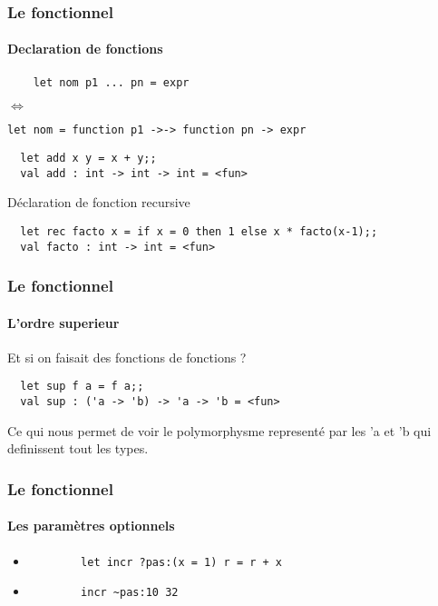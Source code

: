 \begin{frame}[fragile]
  \frametitle{Le fonctionnel}
  \framesubtitle{Declaration de fonctions}
    \begin{lstlisting}
	let nom p1 ... pn = expr
    \end{lstlisting}
	\begin{center}
	  \begin{rotate}{90}
     $\Leftrightarrow$
   \end{rotate}
\end{center}
\begin{lstlisting}
let nom = function p1 ->-> function pn -> expr
  \end{lstlisting}
  \vspace{1cm}
  \begin{lstlisting}
  let add x y = x + y;;
  val add : int -> int -> int = <fun>
  \end{lstlisting}
  Déclaration de fonction recursive 
  \begin{lstlisting}
  let rec facto x = if x = 0 then 1 else x * facto(x-1);;
  val facto : int -> int = <fun>
  \end{lstlisting}
\end{frame}

\begin{frame}[fragile]
  \frametitle{Le fonctionnel}
  \framesubtitle{L'ordre superieur}
  Et si on faisait des fonctions de fonctions ? 
 \begin{lstlisting}
  let sup f a = f a;;
  val sup : ('a -> 'b) -> 'a -> 'b = <fun>
 \end{lstlisting}
 Ce qui nous permet de voir le polymorphysme representé par les 'a et 'b qui definissent tout les types.
\end{frame}

\begin{frame}[fragile]
	\frametitle{Le fonctionnel}
	\framesubtitle{Les paramètres optionnels}
	\begin{itemize}	

	\item 	\begin{lstlisting}
		let incr ?pas:(x = 1) r = r + x
		\end{lstlisting}

	\item 	\begin{lstlisting}
		incr ~pas:10 32
		\end{lstlisting}

\end{itemize}
\end{frame}


